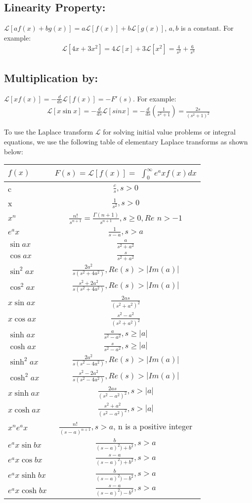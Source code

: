\documentclass[11pt]{report}
\newcommand{\Laplace}{\mathcal{L}}
\newcommand{\sps}{\\[0.2cm]}
\newcommand{\dsp}{\displaystyle}
\newcommand{\NI}{\noindent}
\begin{document}
	\subsection{Linearity Property:}
	$\mathcal{L}[af(x) + bg(x)] = a \mathcal{L}[f(x)] +  b \mathcal{L}[g(x)]$, $a,b$ is a constant. For example:
	\begin{eqnarray*}
		\mathcal{L}[4x + 3x^2] = 4 \mathcal{L}[x] + 3 \mathcal{L}[x^2]= \frac{4}{s ^2} + \frac{6}{s^3}
	\end{eqnarray*}
		
	\subsection{Multiplication by:} 
	$\mathcal{L}[xf(x)] = - \frac{d}{ds} \mathcal{L}[f(x)] = -F'(s)$. For example:
	\begin{eqnarray*}
		\mathcal{L}[x\sin x] = - \frac{d}{ds} \mathcal{L}[sinx] = - \frac{d}{ds} (\frac{1}{s^2 + 1}) = \frac{2s}{(s^2 + 1)^2}
	\end{eqnarray*}

	\NI To use the Laplace transform $\Laplace$ for solving initial value problems or integral equations, we use the following table of elementary Laplace transforms as shown below:\\
	\begin{longtable}{| l | c | } \hline 
		$f(x)$ & $F(s) = \mathcal{L}[f(x)] =$ \(\int_{0}^{\infty} e^ax f(x) dx\)\sps
		\hline
		c & $\dsp\frac{c}{s}, s > 0$\sps
		x & $\dsp\frac{1}{s^2}, s > 0$\sps
		$x^n$ & $\dsp\frac{n!}{s^{n +1}} = \frac{\Gamma (n + 1)}{s^{n + 1}}, s \geq 0, Re$ $n > -1$\sps
		$e^ax$ & $\dsp\frac{1}{s - a}, s > a$\sps
		$\sin ax$ & $\dsp\frac{a}{s^2 + a^2}$\sps
		$\cos ax$ & $\dsp\frac{s}{s^2 + a^2}$\sps 
		$\sin^2 ax$ & $\dsp\frac{2a^2}{s(s^2 + 4 a^2)}, Re(s) > |Im(a)|$\\ 
		$\cos^2 ax$ & $\dsp\frac{s^2 + 2a^2}{s(s^2 + 4 a^2)}, Re(s) > |Im(a)|$\\ 
		$x\sin ax$ & $\dsp\frac{2as}{(s^2 + a^2)^2}$\sps 
		$x\cos ax$ & $\dsp\frac{s^2 - a^2}{(s^2 + a^2)^2}$\sps 
		$\sinh ax$ & $\dsp\frac{a}{s^2 - a^2}, s \geq |a|$\sps
		$\cosh ax$ & $\dsp\frac{s}{s^2 - a^2}, s \geq |a|$\sps 
		$\sinh^2 ax$ & $\dsp\frac{2a^2}{s(s^2 - 4 a^2)}, Re(s) > |Im(a)|$\sps
		$\cosh^2 ax$ & $\dsp\frac{s^2 - 2a^2}{s(s^2 - 4 a^2)}, Re(s) > |Im(a)|$\sps
		$x\sinh ax$ & $\dsp\frac{2as}{(s^2 - a^2)^2}, s > |a|$\sps
		$x\cosh ax$ & $\dsp\frac{s^2 + a^2}{(s^2 - a^2)^2}, s > |a|$\sps 
		$x^n e^ax$ & $\dsp\frac{n!}{(s - a)^{n + 1}}, s > a$, n is a positive integer\sps
		$e^ax \sin bx$ & $\dsp\frac{b}{(s - a)^2) + b^2}, s > a$\sps
		$e^ax \cos bx$ & $\dsp\frac{s - a}{(s - a)^2) + b^2}, s > a$\sps
		$e^ax \sinh bx$ & $\frac{b}{(s - a)^2) - b^2}, s > a$\sps
		$e^ax \cosh bx$ & $\frac{s - a}{(s - a)^2) - b^2}, s > a$\sps 
		\hline
	\end{longtable}
\end{document}
